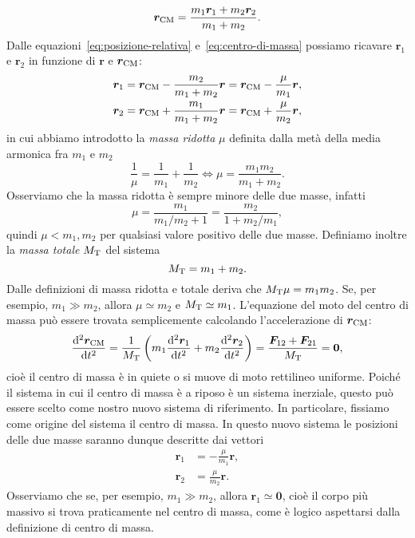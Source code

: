 \begin{equation}
  \label{eq:centro-di-massa}
  \bm{r}_\textup{CM} = \frac{m_1\bm{r}_1+m_2\bm{r}_2}{m_1+m_2}.
\end{equation}
Dalle equazioni~\eqref{eq:posizione-relativa} e~\eqref{eq:centro-di-massa}
possiamo ricavare $\bm{r}_1$ e $\bm{r}_2$ in funzione di $\bm{r}$ e
$\bm{r}_\textup{CM}$:
\begin{subequations}
  \label{eq:r1-r2-posizione-relativa-cdm}
  \begin{align}
    \bm{r}_1 &= \bm{r}_\textup{CM} - \frac{m_2}{m_1+m_2}\bm{r} =
    \bm{r}_\textup{CM} - \frac{\mu}{m_1}\bm{r},\\
    \bm{r}_2 &= \bm{r}_\textup{CM} + \frac{m_1}{m_1+m_2}\bm{r} =
    \bm{r}_\textup{CM} + \frac{\mu}{m_2}\bm{r},
  \end{align}
\end{subequations}
in cui abbiamo introdotto la \emph{massa ridotta} $\mu$ definita dalla metà
della media armonica fra $m_1$ e $m_2$
\begin{equation}
  \frac{1}{\mu} = \frac{1}{m_1} + \frac{1}{m_2} \iff \mu=\frac{m_1m_2}{m_1+m_2}.
\end{equation}
Osserviamo che la massa ridotta è sempre minore delle due masse, infatti
\begin{equation}
  \mu =\frac{m_1}{m_1/m_2+1} = \frac{m_2}{1+m_2/m_1},
\end{equation}
quindi $\mu < m_1,m_2$ per qualsiasi valore positivo delle due masse. Definiamo
inoltre la \emph{massa totale} $M_\textup{T}$ del sistema
\begin{equation}
  M_\textup{T}=m_1+m_2.
\end{equation}
Dalle definizioni di massa ridotta e totale deriva che
$M_\textup{T}\mu=m_1m_2$. Se, per esempio, $m_1\gg m_2$, allora $\mu\simeq m_2$ e
$M_\textup{T}\simeq m_1$. L'equazione del moto del centro di massa può essere
trovata semplicemente calcolando l'accelerazione di $\bm{r}_\textup{CM}$:
\begin{equation}
  \toder[2]{\bm{r}_\textup{CM}}{t} = \frac{1}{M_\textup{T}}
  \left(
    m_1\toder[2]{\bm{r}_1}{t} + m_2\toder[2]{\bm{r}_2}{t}
  \right) = \frac{\bm{F}_{12}+\bm{F}_{21}}{M_\textup{T}} = \bm{0},
\end{equation}
cioè il centro di massa è in quiete o si muove di moto rettilineo
uniforme. Poiché il sistema in cui il centro di massa è a riposo è un sistema
inerziale, questo può essere scelto come nostro nuovo sistema di riferimento.
In particolare, fissiamo come origine del sistema il centro di massa. In questo
nuovo sistema le posizioni delle due masse saranno dunque descritte dai vettori
\begin{subequations}
  \label{eq:r1-r2-nel-cdm}
  \begin{align}
    \bm{r}_1 &= -\frac{\mu}{m_1}\bm{r},\\
    \bm{r}_2 &= \frac{\mu}{m_2}\bm{r}.
  \end{align}
\end{subequations}
Osserviamo che se, per esempio, $m_1\gg m_2$, allora $\bm{r}_1\simeq\bm{0}$,
cioè il corpo più massivo si trova praticamente nel centro di massa, come è
logico aspettarsi dalla definizione di centro di massa.

